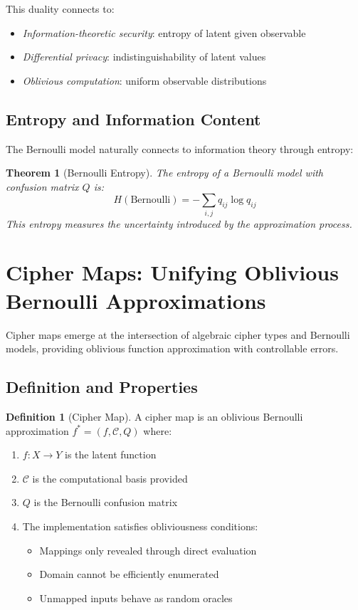 \documentclass[11pt]{article}
\theoremstyle{definition}
\newtheorem{definition}{Definition}[section]
\theoremstyle{plain}
\newtheorem{theorem}{Theorem}[section]
\theoremstyle{remark}
\begin{document}
This duality connects to:
\begin{itemize}
\item \emph{Information-theoretic security}: entropy of latent given observable
\item \emph{Differential privacy}: indistinguishability of latent values
\item \emph{Oblivious computation}: uniform observable distributions
\end{itemize}

\subsection{Entropy and Information Content}

The Bernoulli model naturally connects to information theory through entropy:

\begin{theorem}[Bernoulli Entropy]
\label{thm:bernoulli-entropy}
The entropy of a Bernoulli model with confusion matrix $Q$ is:
$$H(\text{Bernoulli}) = -\sum_{i,j} q_{ij} \log q_{ij}$$
This entropy measures the uncertainty introduced by the approximation process.
\end{theorem}

\section{Cipher Maps: Unifying Oblivious Bernoulli Approximations}
\label{sec:cipher-maps}

Cipher maps emerge at the intersection of algebraic cipher types and Bernoulli models, providing oblivious function approximation with controllable errors.

\subsection{Definition and Properties}

\begin{definition}[Cipher Map]
\label{def:cipher-map}
A cipher map is an oblivious Bernoulli approximation $f^* = (f, \mathcal{C}, Q)$ where:
\begin{enumerate}
\item $f : X \to Y$ is the latent function
\item $\mathcal{C}$ is the computational basis provided
\item $Q$ is the Bernoulli confusion matrix
\item The implementation satisfies obliviousness conditions:
    \begin{itemize}
    \item Mappings only revealed through direct evaluation
    \item Domain cannot be efficiently enumerated
    \item Unmapped inputs behave as random oracles
    \end{itemize}
\end{enumerate}
\end{definition}
\end{document}
